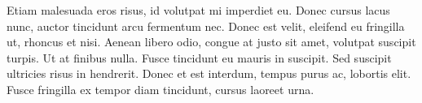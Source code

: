 Etiam malesuada eros risus, id volutpat mi imperdiet eu. Donec cursus lacus nunc, auctor tincidunt arcu fermentum nec. Donec est velit, eleifend eu fringilla ut, rhoncus et nisi. Aenean libero odio, congue at justo sit amet, volutpat suscipit turpis. Ut at finibus nulla. Fusce tincidunt eu mauris in suscipit. Sed suscipit ultricies risus in hendrerit. Donec et est interdum, tempus purus ac, lobortis elit. Fusce fringilla ex tempor diam tincidunt, cursus laoreet urna.